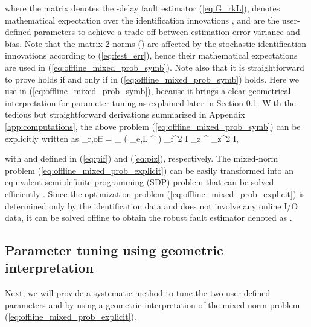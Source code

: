 \documentclass[twocolumn]{autart}
\DeclareMathOperator*{\argmin}{\arg\,\min}
\begin{document}
where the matrix  denotes the -delay fault estimator (\ref{eq:G_rkL}),  denotes mathematical expectation over the identification innovations ,  and  are the user-defined parameters to achieve a trade-off between estimation error variance and bias. Note that the matrix 2-norms  () are affected by the stochastic identification innovations  according to (\ref{eq:fest_err}), hence their mathematical expectations are used in (\ref{eq:offline_mixed_prob_symb}). 
Note also that it is straightforward to prove  holds if and only if  in (\ref{eq:offline_mixed_prob_symb}) holds. Here we use 
 in (\ref{eq:offline_mixed_prob_symb}), because it brings a clear geometrical interpretation for parameter tuning as explained later in Section \ref{sect:tune_geometric}.
With the tedious but straightforward derivations summarized in Appendix \ref{app:computations}, the above problem (\ref{eq:offline_mixed_prob_symb}) can be explicitly written as
\label{eq:offline_mixed_prob_explicit_cost}
_{\rm{r,off}} = \argmin\limits_{}\;  \left(  \Sigma_{e,L} ^ \right)
\label{eq:offline_mixed_prob_explicit_constf}
\;
 \leq \gamma_f^2 I
\label{eq:offline_mixed_prob_explicit_constz}
 \Pi_z ^ \leq \gamma_z^2 I,

with  and  defined in (\ref{eq:pif}) and (\ref{eq:piz}), respectively.
The mixed-norm problem (\ref{eq:offline_mixed_prob_explicit}) can be easily transformed into an equivalent semi-definite programming (SDP) problem that can be solved efficiently \cite{Boyd2004}.
Since the optimization problem (\ref{eq:offline_mixed_prob_explicit}) is determined only by the identification data and does not involve any online I/O data, it can be solved offline to obtain the robust fault estimator denoted as .


\subsection{Parameter tuning using geometric interpretation}
\label{sect:tune_geometric}
Next, we will provide a systematic method to tune the two user-defined parameters  and  by using a geometric interpretation of the mixed-norm problem (\ref{eq:offline_mixed_prob_explicit}).
\end{document}
